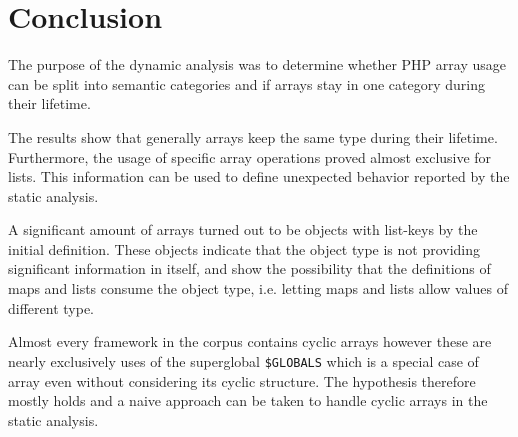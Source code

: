 \section{Conclusion}
\label{sec:studyConclusion}
The purpose of the dynamic analysis was to determine whether PHP array usage can be split into semantic categories and if arrays stay in one category during their lifetime. 

The results show that generally arrays keep the same type during their lifetime. Furthermore, the usage of specific array operations proved almost exclusive for lists. This information can be used to define unexpected behavior reported by the static analysis.

A significant amount of arrays turned out to be objects with list-keys by the initial definition. These objects indicate that the object type is not providing significant information in itself, and show the possibility that the definitions of maps and lists consume the object type, i.e. letting maps and lists allow values of different type.

Almost every framework in the corpus contains cyclic arrays however these are nearly exclusively uses of the superglobal \texttt{\$GLOBALS} which is a special case of array even without considering its cyclic structure. The hypothesis therefore mostly holds and a naive approach can be taken to handle cyclic arrays in the static analysis.